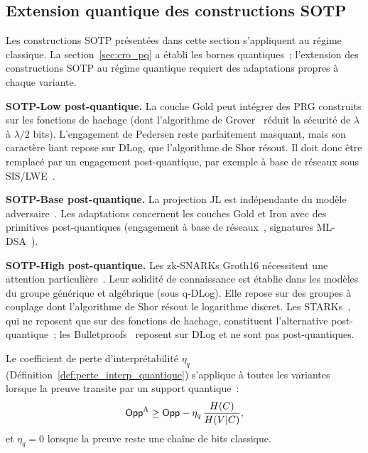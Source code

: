 \subsection{Extension quantique des constructions SOTP}
\label{subsec:extension_postquantique_sotp}
\begin{sloppypar}
Les constructions SOTP pr\'esent\'ees dans cette section s'appliquent au r\'egime classique.
La section~\ref{sec:cro_pq} a \'etabli les bornes quantiques~; 
l'extension des constructions SOTP au r\'egime quantique requiert des adaptations 
propres \`a chaque variante.

\textbf{SOTP-Low post-quantique.} La couche Gold peut int\'egrer des PRG construits sur 
les fonctions de hachage (dont l'algorithme de Grover~\cite{Grover96} r\'eduit la s\'ecurit\'e de $\lambda$
\`a $\lambda/2$ bits). L'engagement de Pedersen
reste parfaitement masquant, mais son caract\`ere liant repose sur DLog, que
l'algorithme de Shor r\'esout. Il doit donc \^etre remplac\'e par un engagement
post-quantique, par exemple \`a base de r\'eseaux sous SIS/LWE~\cite{Peikert2016}.

\textbf{SOTP-Base post-quantique.} La projection JL est ind\'ependante du mod\`ele 
adversaire~\cite{JohnsonLindenstrauss84,DasguptaGupta03}. Les adaptations concernent les couches Gold et Iron avec des primitives 
post-quantiques (engagement \`a base de r\'eseaux~\cite{Peikert2016}, signatures ML-DSA~\cite{Dilithium2022}).

\textbf{SOTP-High post-quantique.} Les zk-SNARKs Groth16 n\'ecessitent une attention 
particuli\`ere~\cite{Unruh2016,Chatterjee2021}. Leur solidit\'e de connaissance est \'etablie dans les
mod\`eles du groupe g\'en\'erique et alg\'ebrique (sous q-DLog). Elle repose sur des groupes \`a couplage
dont l'algorithme de Shor r\'esout le logarithme discret. Les STARKs~\cite{BenSasson2019}, qui ne reposent que sur des fonctions de
hachage, constituent l'alternative post-quantique~; les Bulletproofs~\cite{Bunz19}
reposent sur DLog et ne sont pas post-quantiques.

Le coefficient de perte d'interpr\'etabilit\'e $\eta_q$
(D\'efinition~\ref{def:perte_interp_quantique}) s'applique \`a toutes les variantes
lorsque la preuve transite par un support quantique~:
\begin{equation}
\mathsf{Opp}^{\Lambda} \geq \mathsf{Opp} - \eta_q\,\frac{H(C)}{H(V|C)},
\end{equation}
et $\eta_q = 0$ lorsque la preuve reste une cha\^ine de bits classique.
\end{sloppypar}

